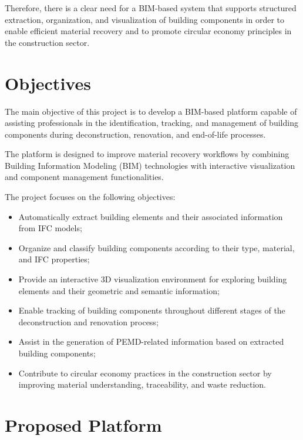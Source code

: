 \documentclass[11pt,a4paper]{article}
\begin{document}
Therefore, there is a clear need for a BIM-based system that supports structured extraction, organization, and visualization of building components in order to enable efficient material recovery and to promote circular economy principles in the construction sector.

\section{Objectives}

The main objective of this project is to develop a BIM-based platform capable of assisting professionals in the identification, tracking, and management of building components during deconstruction, renovation, and end-of-life processes.

The platform is designed to improve material recovery workflows by combining Building Information Modeling (BIM) technologies with interactive visualization and component management functionalities.

The project focuses on the following objectives:

\begin{itemize}
    \item Automatically extract building elements and their associated information from IFC models;
    \item Organize and classify building components according to their type, material, and IFC properties;
    \item Provide an interactive 3D visualization environment for exploring building elements and their geometric and semantic information;
    \item Enable tracking of building components throughout different stages of the deconstruction and renovation process;
    \item Assist in the generation of PEMD-related information based on extracted building components;
    \item Contribute to circular economy practices in the construction sector by improving material understanding, traceability, and waste reduction.
\end{itemize}

\section{Proposed Platform}
\end{document}
